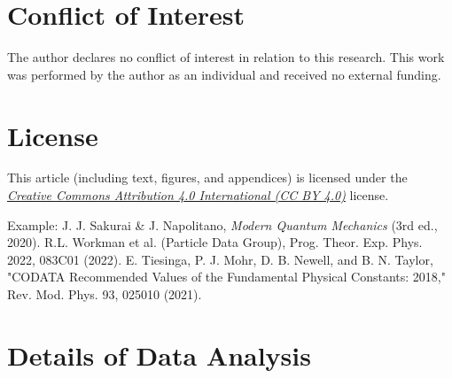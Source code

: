 \documentclass[11pt,a4paper]{article}
\begin{document}
\section*{Conflict of Interest}
The author declares no conflict of interest in relation to this research. This work was performed by the author as an individual and received no external funding.

\section*{License}
This article (including text, figures, and appendices) is licensed under the \href{http://creativecommons.org/licenses/by/4.0/}{\textit{Creative Commons Attribution 4.0 International (CC BY 4.0)}} license.

\begin{thebibliography}{9}
    Example: J. J. Sakurai \& J. Napolitano, \textit{Modern Quantum Mechanics} (3rd ed., 2020).
    R.L. Workman et al. (Particle Data Group), Prog. Theor. Exp. Phys. 2022, 083C01 (2022).
    E. Tiesinga, P. J. Mohr, D. B. Newell, and B. N. Taylor, "CODATA Recommended Values of the Fundamental Physical Constants: 2018," Rev. Mod. Phys. 93, 025010 (2021).
\end{thebibliography}

\appendix
\section{Details of Data Analysis}
\end{document}
